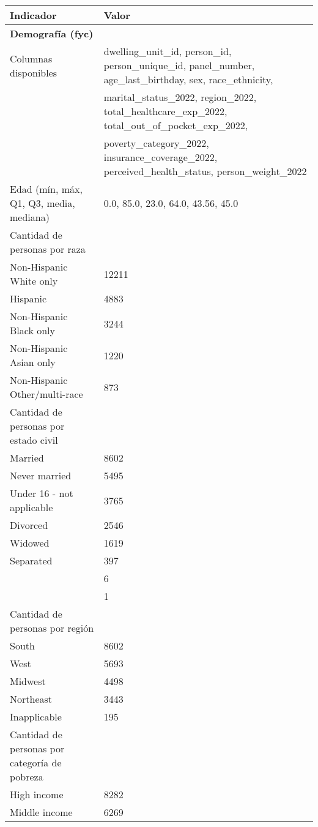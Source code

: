 \documentclass[12pt,a4paper]{article}
\begin{document}
\begin{table}[H]
\centering
\begin{tabular}{ll}
\toprule
\textbf{Indicador} & \textbf{Valor} \\
\midrule
\multicolumn{2}{l}{\textbf{Demografía (fyc)}} \\
Columnas disponibles & dwelling\_unit\_id, person\_id, person\_unique\_id, panel\_number, age\_last\_birthday, sex, race\_ethnicity, \\ 
 & marital\_status\_2022, region\_2022, total\_healthcare\_exp\_2022, total\_out\_of\_pocket\_exp\_2022, \\ 
 & poverty\_category\_2022, insurance\_coverage\_2022, perceived\_health\_status, person\_weight\_2022 \\
Edad (mín, máx, Q1, Q3, media, mediana) & 0.0, 85.0, 23.0, 64.0, 43.56, 45.0 \\
\midrule
Cantidad de personas por raza &  \\
\quad Non-Hispanic White only & 12211 \\
\quad Hispanic & 4883 \\
\quad Non-Hispanic Black only & 3244 \\
\quad Non-Hispanic Asian only & 1220 \\
\quad Non-Hispanic Other/multi-race & 873 \\
\midrule
Cantidad de personas por estado civil &  \\
\quad Married & 8602 \\
\quad Never married & 5495 \\
\quad Under 16 - not applicable & 3765 \\
\quad Divorced & 2546 \\
\quad Widowed & 1619 \\
\quad Separated & 397 \\
\quad -7 & 6 \\
\quad -8 & 1 \\
\midrule
Cantidad de personas por región &  \\
\quad South & 8602 \\
\quad West & 5693 \\
\quad Midwest & 4498 \\
\quad Northeast & 3443 \\
\quad Inapplicable & 195 \\
\midrule
Cantidad de personas por categoría de pobreza &  \\
\quad High income & 8282 \\
\quad Middle income & 6269 \\

\end{tabular}
\end{table}
\end{document}
